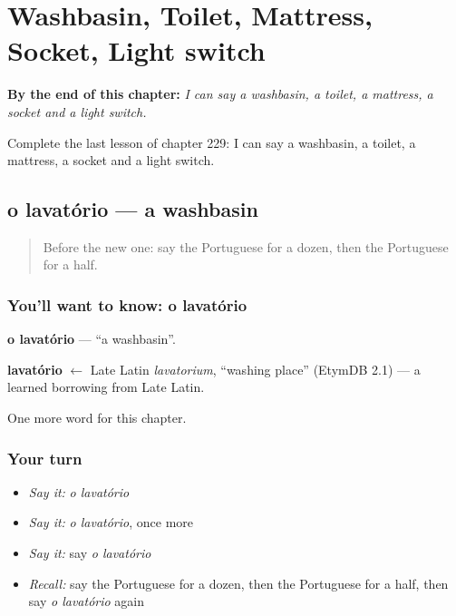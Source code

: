 
\chapter{Washbasin, Toilet, Mattress, Socket, Light switch}
\label{ch:pt-washbasin-toilet-mattress-socket-light-switch}

\begin{chapteropening}
\textbf{By the end of this chapter:} \emph{I can say a washbasin, a toilet, a mattress, a socket and a light switch.}

Complete the last lesson of chapter 229: I can say a washbasin, a toilet, a mattress, a socket and a light switch.
\end{chapteropening}

\section[o lavatório]{o lavatório — a washbasin}

\label{lesson:PT-C229-lavatorio}



\begin{quote}
Before the new one: say the Portuguese for a dozen, then the Portuguese for a half.
\end{quote}

\subsection*{You'll want to know: o lavatório}
\textbf{o lavatório} — \textquotedblleft{}a washbasin\textquotedblright{}.

\begin{cousinweb}
\textbf{lavatório} $\leftarrow$ Late Latin \emph{lavatorium}, \textquotedblleft{}washing place\textquotedblright{} (EtymDB 2.1) — a learned borrowing from Late Latin.
\end{cousinweb}

\begin{grammarlens}[title={What you've built}]
One more word for this chapter.
\end{grammarlens}

\subsection*{Your turn}
\begin{itemize}
\raggedright
  \item \emph{Say it:} \emph{o lavatório}
  \item \emph{Say it:} \emph{o lavatório}, once more
  \item \emph{Say it:} say \emph{o lavatório}
  \item \emph{Recall:} say the Portuguese for a dozen, then the Portuguese for a half, then say \emph{o lavatório} again
\end{itemize}

